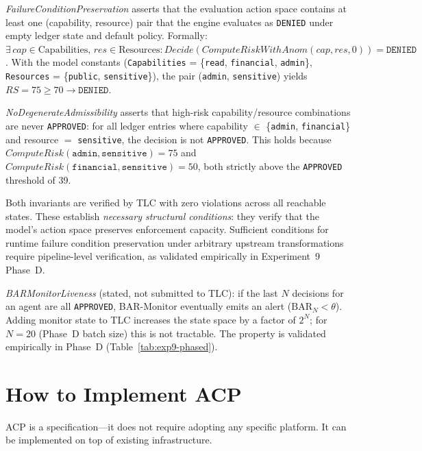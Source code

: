 \documentclass[11pt]{article}
\theoremstyle{definition}
\begin{document}
\textit{FailureConditionPreservation} asserts that the evaluation action space
contains at least one (capability, resource) pair that the engine evaluates as
\texttt{DENIED} under empty ledger state and default policy.
Formally: $\exists\, \mathit{cap} \in \text{Capabilities},\, \mathit{res} \in \text{Resources} :
\mathit{Decide}(\mathit{ComputeRiskWithAnom}(\mathit{cap}, \mathit{res}, 0)) = \texttt{DENIED}$.
With the model constants (\texttt{Capabilities} = \{\texttt{read}, \texttt{financial}, \texttt{admin}\},
\texttt{Resources} = \{\texttt{public}, \texttt{sensitive}\}),
the pair (\texttt{admin}, \texttt{sensitive}) yields $\mathit{RS} = 75 \geq 70 \to \texttt{DENIED}$.

\textit{NoDegenerateAdmissibility} asserts that high-risk capability/resource
combinations are never \texttt{APPROVED}: for all ledger entries where
capability $\in$ \{\texttt{admin}, \texttt{financial}\} and resource $=$ \texttt{sensitive},
the decision is not \texttt{APPROVED}.
This holds because $\mathit{ComputeRisk}(\texttt{admin}, \texttt{sensitive}) = 75$
and $\mathit{ComputeRisk}(\texttt{financial}, \texttt{sensitive}) = 50$,
both strictly above the \texttt{APPROVED} threshold of 39.

Both invariants are verified by TLC with zero violations across all reachable states.
These establish \emph{necessary structural conditions}: they verify that the model's
action space preserves enforcement capacity.
Sufficient conditions for runtime failure condition preservation under arbitrary
upstream transformations require pipeline-level verification, as validated
empirically in Experiment~9 Phase~D.

\textit{BARMonitorLiveness} (stated, not submitted to TLC): if the last $N$
decisions for an agent are all \texttt{APPROVED}, BAR-Monitor eventually emits
an alert ($\mathrm{BAR}_N < \theta$).
Adding monitor state to TLC increases the state space by a factor of $2^N$;
for $N=20$ (Phase~D batch size) this is not tractable.
The property is validated empirically in Phase~D (Table~\ref{tab:exp9-phased}).

\section{How to Implement ACP}

ACP is a specification---it does not require adopting any specific platform.
It can be implemented on top of existing infrastructure.
\end{document}
